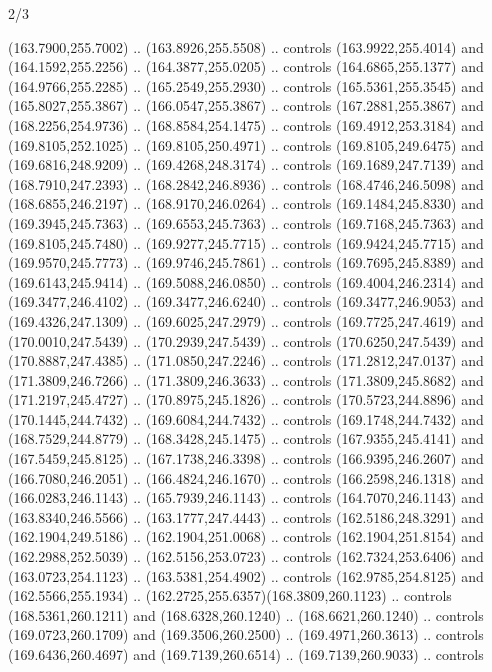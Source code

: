 \begin{flagdescription}{2/3}
\begin{scope}[xshift=0.5\flaglength,yshift=0.5\flagwidth,scale=\flagwidth/235.81]
\begin{scope}[y=0.8pt, x=0.8pt, yscale=-1,shift={(-239.08,-147.38)}]
    (163.7900,255.7002) .. (163.8926,255.5508) .. controls (163.9922,255.4014) and
    (164.1592,255.2256) .. (164.3877,255.0205) .. controls (164.6865,255.1377) and
    (164.9766,255.2285) .. (165.2549,255.2930) .. controls (165.5361,255.3545) and
    (165.8027,255.3867) .. (166.0547,255.3867) .. controls (167.2881,255.3867) and
    (168.2256,254.9736) .. (168.8584,254.1475) .. controls (169.4912,253.3184) and
    (169.8105,252.1025) .. (169.8105,250.4971) .. controls (169.8105,249.6475) and
    (169.6816,248.9209) .. (169.4268,248.3174) .. controls (169.1689,247.7139) and
    (168.7910,247.2393) .. (168.2842,246.8936) .. controls (168.4746,246.5098) and
    (168.6855,246.2197) .. (168.9170,246.0264) .. controls (169.1484,245.8330) and
    (169.3945,245.7363) .. (169.6553,245.7363) .. controls (169.7168,245.7363) and
    (169.8105,245.7480) .. (169.9277,245.7715) .. controls (169.9424,245.7715) and
    (169.9570,245.7773) .. (169.9746,245.7861) .. controls (169.7695,245.8389) and
    (169.6143,245.9414) .. (169.5088,246.0850) .. controls (169.4004,246.2314) and
    (169.3477,246.4102) .. (169.3477,246.6240) .. controls (169.3477,246.9053) and
    (169.4326,247.1309) .. (169.6025,247.2979) .. controls (169.7725,247.4619) and
    (170.0010,247.5439) .. (170.2939,247.5439) .. controls (170.6250,247.5439) and
    (170.8887,247.4385) .. (171.0850,247.2246) .. controls (171.2812,247.0137) and
    (171.3809,246.7266) .. (171.3809,246.3633) .. controls (171.3809,245.8682) and
    (171.2197,245.4727) .. (170.8975,245.1826) .. controls (170.5723,244.8896) and
    (170.1445,244.7432) .. (169.6084,244.7432) .. controls (169.1748,244.7432) and
    (168.7529,244.8779) .. (168.3428,245.1475) .. controls (167.9355,245.4141) and
    (167.5459,245.8125) .. (167.1738,246.3398) .. controls (166.9395,246.2607) and
    (166.7080,246.2051) .. (166.4824,246.1670) .. controls (166.2598,246.1318) and
    (166.0283,246.1143) .. (165.7939,246.1143) .. controls (164.7070,246.1143) and
    (163.8340,246.5566) .. (163.1777,247.4443) .. controls (162.5186,248.3291) and
    (162.1904,249.5186) .. (162.1904,251.0068) .. controls (162.1904,251.8154) and
    (162.2988,252.5039) .. (162.5156,253.0723) .. controls (162.7324,253.6406) and
    (163.0723,254.1123) .. (163.5381,254.4902) .. controls (162.9785,254.8125) and
    (162.5566,255.1934) .. (162.2725,255.6357)(168.3809,260.1123) .. controls
    (168.5361,260.1211) and (168.6328,260.1240) .. (168.6621,260.1240) .. controls
    (169.0723,260.1709) and (169.3506,260.2500) .. (169.4971,260.3613) .. controls
    (169.6436,260.4697) and (169.7139,260.6514) .. (169.7139,260.9033) .. controls

\end{scope}
\end{scope}
\end{flagdescription}
